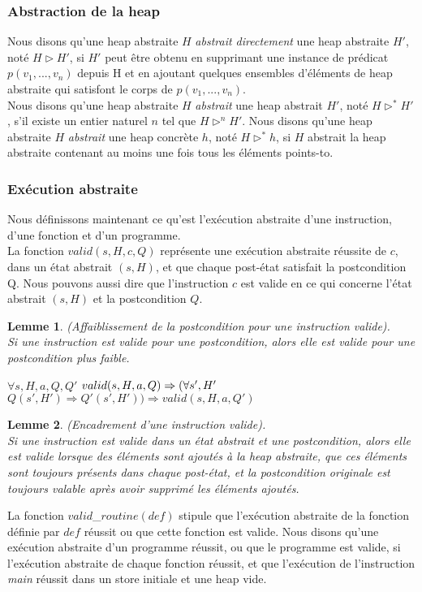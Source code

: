 \documentclass[9pt,openany]{book}
\newtheorem{lemme}{Lemme}
\begin{document}
			\subsubsection{Abstraction de la heap}
		Nous disons qu'une heap abstraite $H$ \textit{abstrait directement} une heap abstraite $H'$, not\'e $H \rhd H'$, si $H'$ peut \^etre obtenu en supprimant une instance de pr\'edicat $p(v_1,...,v_n)$ depuis H et en ajoutant quelques ensembles d'\'el\'ements de heap abstraite qui satisfont le corps de $p(v_1,...,v_n)$.\\
		Nous disons qu'une heap abstraite $H$ \textit{abstrait} une heap abstrait $H'$, not\'e $H\rhd^* H'$, s'il existe un entier naturel $n$ tel que $H\rhd^n H'$.
		Nous disons qu'une heap abstraite $H$ \textit{abstrait} une heap concr\`ete $h$, not\'e $H\rhd^* h$, si $H$ abstrait la heap abstraite contenant au moins une fois tous les \'el\'ements points-to.\\
			\subsubsection{Ex\'ecution abstraite}
		Nous d\'efinissons maintenant ce qu'est l'ex\'ecution abstraite d'une instruction, d'une fonction et d'un programme.\\
		La fonction $valid(s,H,c,Q)$ repr\'esente une ex\'ecution abstraite  r\'eussite de $c$, dans un \'etat abstrait $(s,H)$, et que chaque post-\'etat satisfait la postcondition Q. Nous pouvons aussi dire que l'instruction $c$ est valide en ce qui concerne l'\'etat abstrait $(s,H)$ et la postcondition $Q$.
		\begin{lemme}
			(Affaiblissement de la postcondition pour une instruction valide).\\
			Si une instruction est valide pour une postcondition, alors elle est valide pour une postcondition plus faible.
			
$\forall s,H,a,Q,Q'$ $valid(s,H,a,Q)\Rightarrow\\(\forall s', H'$ $Q(s',H')\Rightarrow Q'(s',H'))\Rightarrow valid(s,H,a,Q')$
		\end{lemme}
		
		\begin{lemme}
			(Encadrement d'une instruction valide).\\
			Si une instruction est valide dans un \'etat abstrait et une postcondition, alors elle est valide lorsque des \'el\'ements sont ajout\'es \`a la heap abstraite, que ces \'el\'ements sont toujours pr\'esents dans chaque post-\'etat, et la postcondition originale est toujours valable apr\`es avoir supprim\'e les \'el\'ements ajout\'es.
		\end{lemme}
		La fonction $valid$_$routine(def)$ stipule que l'ex\'ecution abstraite de la fonction d\'efinie par $def$ r\'eussit ou que cette fonction est valide. Nous disons qu'une ex\'ecution abstraite d'un programme r\'eussit, ou que le programme est valide, si l'ex\'ecution abstraite de chaque fonction r\'eussit, et que l'ex\'ecution de l'instruction \textit{main} r\'eussit dans un store initiale et une heap vide.\\
\end{document}
